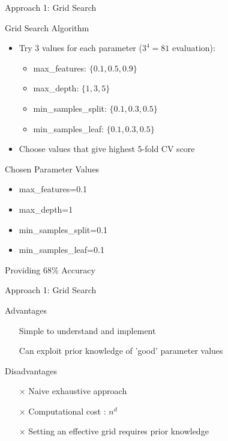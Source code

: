 \documentclass{beamer}
\begin{document}
\begin{frame}{Approach 1: Grid Search}
	\begin{block}{Grid Search Algorithm}
		\begin{itemize}
			\item Try 3 values for each parameter ($3^4=81$ evaluation):
			\begin{itemize}
				\item max\_features: $\{0.1,0.5,0.9\}$
				\item max\_depth: $\{1,3,5\}$
				\item min\_samples\_split: $\{0.1,0.3,0.5\}$
				\item min\_samples\_leaf: $\{0.1,0.3,0.5\}$
			\end{itemize}
		\item Choose values that give highest 5-fold CV score
		\end{itemize}
	\end{block}

\begin{block}{Chosen Parameter Values}
	\begin{itemize}
		\item max\_features=0.1
		\item max\_depth=1
		\item min\_samples\_split=0.1
		\item min\_samples\_leaf=0.1
	\end{itemize} 
	Providing 68\% Accuracy
\end{block}
\end{frame}
\begin{frame}{Approach 1: Grid Search}
	\begin{block}{Advantages}
		\begin{itemize}
			\item[\checkmark] Simple to understand and implement
			\item[\checkmark] Can exploit prior knowledge of 'good' parameter values
		\end{itemize}
	\end{block}
\begin{block}{Disadvantages}
	\begin{itemize}
		\item[$\times$] Naive exhaustive approach
		\item[$\times$] Computational cost : $n^d$
		\item[$\times$] Setting an effective grid requires prior knowledge
	\end{itemize}
\end{block}
\end{frame}
\end{document}
